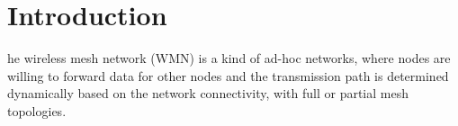 \section{Introduction}
he wireless mesh network (WMN) is a kind of ad-hoc
networks, where nodes are willing to forward data for other nodes
and the transmission path is determined dynamically based on the 
network connectivity, with full or partial mesh topologies.
